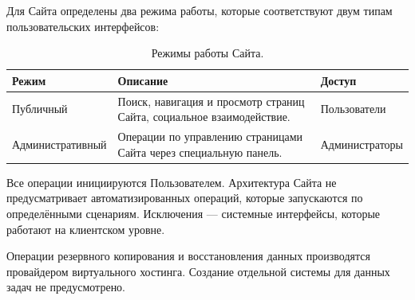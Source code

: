 
Для Сайта определены два режима работы, которые соответствуют двум типам пользовательских интерфейсов:

\begin{table}[H]
  \renewcommand{\arraystretch}{1.5}
  \begin{tabularx}{\textwidth}{|p{4cm}|X|p{3.5cm}|}
    \hline
    \textbf{Режим} & \textbf{Описание} & \textbf{Доступ} \\ \hline
    Публичный & Поиск, навигация и просмотр страниц Сайта, социальное взаимодействие. & Пользователи \\ \hline
    Административный & Операции по управлению страницами Сайта через специальную панель. & Администраторы \\ \hline
  \end{tabularx}
  \caption{Режимы работы Сайта.}
\end{table}

Все операции инициируются Пользователем. Архитектура Сайта не предусматривает автоматизированных операций, которые запускаются по определёнными сценариям. Исключения --- системные интерфейсы, которые работают на клиентском уровне.

Операции резервного копирования и восстановления данных производятся провайдером виртуального хостинга. Создание отдельной системы для данных задач не предусмотрено.